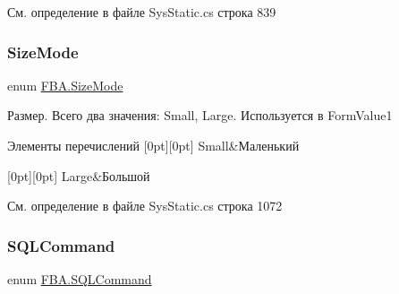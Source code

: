 См. определение в файле Sys\+Static.\+cs строка 839

\mbox{\label{namespace_f_b_a_a31f4a0fbaafbf41e35e4589c7f489675}} 
\subsubsection{\texorpdfstring{Size\+Mode}{SizeMode}}
{\footnotesize\ttfamily enum \mbox{\hyperlink{namespace_f_b_a_a31f4a0fbaafbf41e35e4589c7f489675}{F\+B\+A.\+Size\+Mode}}\hspace{0.3cm}{\ttfamily [strong]}}



Размер. Всего два значения\+: Small, Large. Используется в Form\+Value1 

\begin{DoxyEnumFields}{Элементы перечислений}
[0pt][0pt]{}\mbox{\label{namespace_f_b_a_a31f4a0fbaafbf41e35e4589c7f489675a2660064e68655415da2628c2ae2f7592}} 
Small&Маленький \\
\hline

[0pt][0pt]{}\mbox{\label{namespace_f_b_a_a31f4a0fbaafbf41e35e4589c7f489675a3a69b34ce86dacb205936a8094f6c743}} 
Large&Большой \\
\hline

\end{DoxyEnumFields}


См. определение в файле Sys\+Static.\+cs строка 1072

\mbox{\label{namespace_f_b_a_a73208cd254b643d096fa9a17ad6c1ffe}} 
\subsubsection{\texorpdfstring{S\+Q\+L\+Command}{SQLCommand}}
{\footnotesize\ttfamily enum \mbox{\hyperlink{namespace_f_b_a_a73208cd254b643d096fa9a17ad6c1ffe}{F\+B\+A.\+S\+Q\+L\+Command}}\hspace{0.3cm}{\ttfamily [strong]}}



